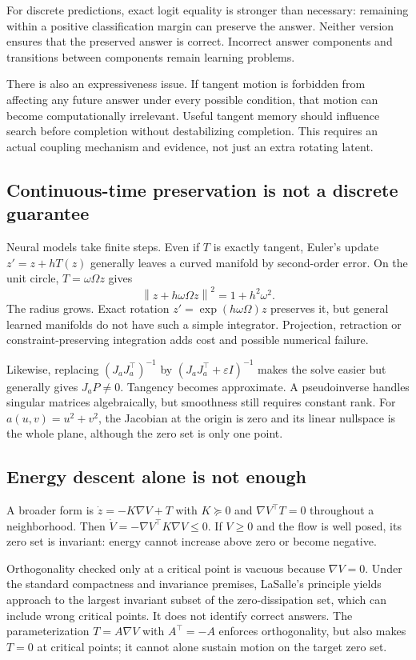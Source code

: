 \documentclass[11pt,a4paper]{article}
\newcommand{\norm}[1]{\left\lVert #1\right\rVert}
\begin{document}
For discrete predictions, exact logit equality is stronger than necessary: remaining within a positive classification margin can preserve the answer. Neither version ensures that the preserved answer is correct. Incorrect answer components and transitions between components remain learning problems.

There is also an expressiveness issue. If tangent motion is forbidden from affecting any future answer under every possible condition, that motion can become computationally irrelevant. Useful tangent memory should influence search before completion without destabilizing completion. This requires an actual coupling mechanism and evidence, not just an extra rotating latent.

\subsection{Continuous-time preservation is not a discrete guarantee}
Neural models take finite steps. Even if $T$ is exactly tangent, Euler's update $z'=z+hT(z)$ generally leaves a curved manifold by second-order error. On the unit circle, $T=\omega\Omega z$ gives
\[
\norm{z+h\omega\Omega z}^2=1+h^2\omega^2.
\]
The radius grows. Exact rotation $z'=\exp(h\omega\Omega)z$ preserves it, but general learned manifolds do not have such a simple integrator. Projection, retraction or constraint-preserving integration adds cost and possible numerical failure.

Likewise, replacing $(J_aJ_a^\top)^{-1}$ by $(J_aJ_a^\top+\varepsilon I)^{-1}$ makes the solve easier but generally gives $J_aP\ne0$. Tangency becomes approximate. A pseudoinverse handles singular matrices algebraically, but smoothness still requires constant rank. For $a(u,v)=u^2+v^2$, the Jacobian at the origin is zero and its linear nullspace is the whole plane, although the zero set is only one point.

\subsection{Energy descent alone is not enough}
A broader form is $\dot z=-K\nabla V+T$ with $K\succeq0$ and $\nabla V^\top T=0$ throughout a neighborhood. Then $\dot V=-\nabla V^\top K\nabla V\le0$. If $V\ge0$ and the flow is well posed, its zero set is invariant: energy cannot increase above zero or become negative.

Orthogonality checked only at a critical point is vacuous because $\nabla V=0$. Under the standard compactness and invariance premises, LaSalle's principle yields approach to the largest invariant subset of the zero-dissipation set, which can include wrong critical points. It does not identify correct answers. The parameterization $T=A\nabla V$ with $A^\top=-A$ enforces orthogonality, but also makes $T=0$ at critical points; it cannot alone sustain motion on the target zero set.
\end{document}
